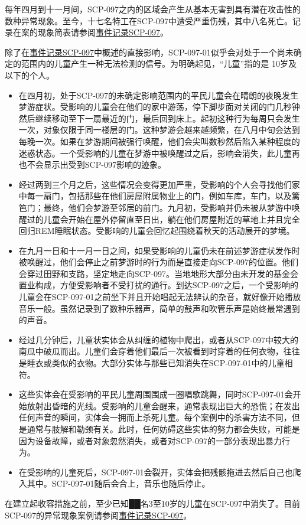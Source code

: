 每年四月到十一月间，SCP-097之内的区域会产生从基本无害到具有潜在攻击性的数种异常现象。至今，十七名特工在SCP-097中遭受严重伤残，其中八名死亡。记录在案的现象简表请参阅\hyperref[sec:DOC-event-log-scp-097]{事件记录SCP-097}。

除了在\hyperref[sec:DOC-event-log-scp-097]{事件记录SCP-097}中概述的直接影响，SCP-097-01似乎会对处于一个尚未确定的范围内的儿童产生一种无法检测的信号。为明确起见，“儿童”指的是 10岁及以下的个人。

\begin{itemize}
\item 在四月初，处于SCP-097的未确定影响范围内的平民儿童会在晴朗的夜晚发生梦游症状。受影响的儿童会在他们的家中游荡，停下脚步面对关闭的门几秒钟然后继续移动至下一扇最近的门，最后回到床上。起初这种行为每周只会发生一次，对象仅限于同一楼层的门。这种梦游会越来越频繁，在八月中旬会达到每晚一次。如果在梦游期间被强行唤醒，他们会尖叫数秒然后陷入某种程度的迷惑状态。一个受影响的儿童在梦游中被唤醒过之后，影响会消失，此儿童再也不会显示出受到SCP-097影响的迹象。
\item 经过两到三个月之后，这些情况会变得更加严重，受影响的个人会寻找他们家中每一扇门，包括那些在他们房屋附属物业上的门，例如车库，车门，以及篱笆门；最终，他们会梦游至邻居的前门。九月初，受影响并仍未被从梦游中唤醒过的儿童会开始在屋外停留直至日出，躺在他们房屋附近的草地上并且完全回归REM睡眠状态。受影响的儿童会回忆起围绕着秋天的活动展开的梦境。
\item 在九月一日和十一月一日之间，如果受影响的儿童仍未在前述梦游症状发作时被唤醒过，他们会停止之前梦游时的行为而是直接走向SCP-097的位置。他们会穿过田野和支路，坚定地走向SCP-097。当地地形大部分由未开发的基金会置业构成，方便受影响者不受打扰的通行。到达SCP-097之后，一个受影响的儿童会在SCP-097-01之前坐下并且开始唱起无法辨认的杂音，就好像开始播放音乐一般。虽然记录到了数种乐器声，简单的鼓声和吹管乐声是始终最常遇到的声音。
\item 经过几分钟后，儿童状实体会从纠缠的植物中爬出，或者从SCP-097中较大的南瓜中破瓜而出。儿童们会穿着他们最后一次被看到时穿着的任何衣物，往往是睡衣或类似的衣物。大部分实体与那些已知消失在SCP-097-01中的儿童相符。
\item 这些实体会在受影响的平民儿童周围围成一圈唱歌跳舞，同时SCP-097-01会开始放射出昏暗的光线。受影响的儿童会醒来，通常表现出巨大的恐慌；在发出任何声音的瞬间，实体会一拥而上杀死儿童。每个案例中的杀害方法不同，但是通常与肢解和勒颈有关。此时，任何妨碍这些实体的努力都会失败，可能是因为设备故障，或者对象忽然消失，或者对SCP-097的一部分表现出暴力行为。
\item 在受影响的儿童死后，SCP-097-01会裂开，实体会把残骸拖进去然后自己也爬入其中。SCP-097-01随后会合上，音乐也随后停止。
\end{itemize}

在建立起收容措施之前，至少已知██名3至10岁的儿童在SCP-097中消失了。目前SCP-097的异常现象案例请参阅\hyperref[sec:DOC-event-log-scp-097]{事件记录SCP-097}。

\newpage

